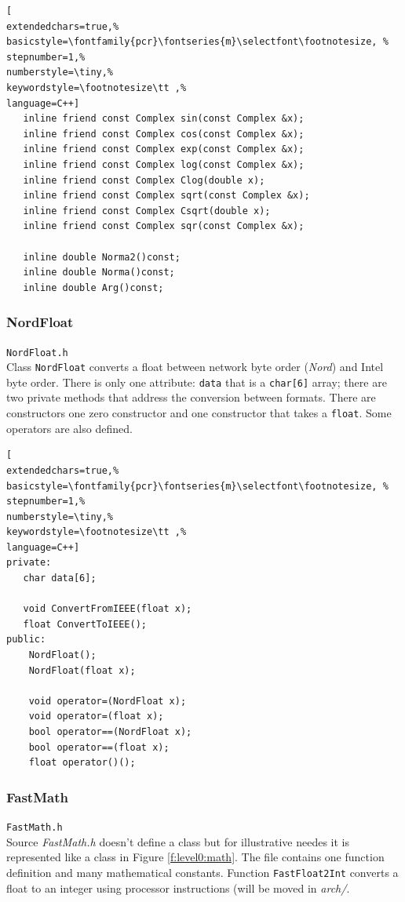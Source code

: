 \begin{lstlisting}[
extendedchars=true,%
basicstyle=\fontfamily{pcr}\fontseries{m}\selectfont\footnotesize, %
stepnumber=1,%
numberstyle=\tiny,%
keywordstyle=\footnotesize\tt ,%
language=C++]
   inline friend const Complex sin(const Complex &x);
   inline friend const Complex cos(const Complex &x);
   inline friend const Complex exp(const Complex &x);
   inline friend const Complex log(const Complex &x);
   inline friend const Complex Clog(double x);
   inline friend const Complex sqrt(const Complex &x);
   inline friend const Complex Csqrt(double x);
   inline friend const Complex sqr(const Complex &x);

   inline double Norma2()const;
   inline double Norma()const;
   inline double Arg()const;
\end{lstlisting}



\subsubsection{NordFloat}
\texttt{NordFloat.h}\\
Class \texttt{NordFloat} converts a float between network byte order (\textit{Nord}) and Intel byte order. There is only one attribute: \texttt{data} that is a \texttt{char[6]} array; there are two private methods that address the conversion between formats. There are constructors one zero constructor and one constructor that takes a \texttt{float}. Some operators are also defined.

\begin{lstlisting}[
extendedchars=true,%
basicstyle=\fontfamily{pcr}\fontseries{m}\selectfont\footnotesize, %
stepnumber=1,%
numberstyle=\tiny,%
keywordstyle=\footnotesize\tt ,%
language=C++]
private:
   char data[6];

   void ConvertFromIEEE(float x);
   float ConvertToIEEE();
public:
    NordFloat();
    NordFloat(float x);

    void operator=(NordFloat x);
    void operator=(float x);
    bool operator==(NordFloat x);
    bool operator==(float x);
    float operator()();
\end{lstlisting}



\subsubsection{FastMath}
\texttt{FastMath.h}\\
Source \textit{FastMath.h} doesn't define a class but for illustrative needes it is represented like a class in Figure \ref{f:level0:math}. The file contains one function definition and many mathematical constants. Function \texttt{FastFloat2Int} converts a float to an integer using processor instructions (will be moved in \textit{arch/}.


